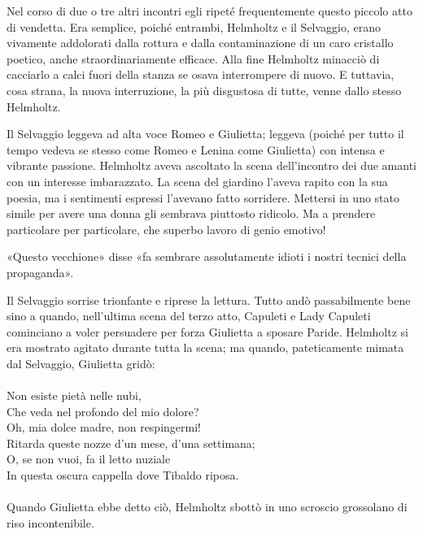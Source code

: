 \documentclass[
a5paper, %
10pt, %
twoside, 
onecolumn, %
openany, %
]{memoir}
\begin{document}
Nel corso di due o tre altri incontri egli ripeté frequentemente questo piccolo atto di vendetta. Era semplice, poiché entrambi, Helmholtz e il Selvaggio, erano vivamente addolorati dalla rottura e dalla contaminazione di un caro cristallo poetico, anche straordinariamente efficace. Alla fine Helmholtz minacciò di cacciarlo a calci fuori della stanza se osava interrompere di nuovo. E tuttavia, cosa strana, la nuova interruzione, la più disgustosa di tutte, venne dallo stesso Helmholtz.

Il Selvaggio leggeva ad alta voce Romeo e Giulietta; leggeva (poiché per tutto il tempo vedeva se stesso come Romeo e Lenina come Giulietta) con intensa e vibrante passione. Helmholtz aveva ascoltato la scena dell’incontro dei due amanti con un interesse imbarazzato. La scena del giardino l’aveva rapito con la sua poesia, ma i sentimenti espressi l’avevano fatto sorridere. Mettersi in uno stato simile per avere una donna gli sembrava piuttosto ridicolo. Ma a prendere particolare per particolare, che superbo lavoro di genio emotivo!

«Questo vecchione» disse «fa sembrare assolutamente idioti i nostri tecnici della propaganda».

Il Selvaggio sorrise trionfante e riprese la lettura. Tutto andò passabilmente bene sino a quando, nell’ultima scena del terzo atto, Capuleti e Lady Capuleti cominciano a voler persuadere per forza Giulietta a sposare Paride. Helmholtz si era mostrato agitato durante tutta la scena; ma quando, pateticamente mimata dal Selvaggio, Giulietta gridò:
\leavevmode\\\leavevmode\\
{\tiny Non esiste pietà nelle nubi,\\
Che veda nel profondo del mio dolore?\\
Oh, mia dolce madre, non respingermi!\\
Ritarda queste nozze d’un mese, d’una settimana;\\
O, se non vuoi, fa il letto nuziale\\
In questa oscura cappella dove Tibaldo riposa.}
\leavevmode\\\leavevmode\\
Quando Giulietta ebbe detto ciò, Helmholtz sbottò in uno scroscio grossolano di riso incontenibile.
\end{document}
